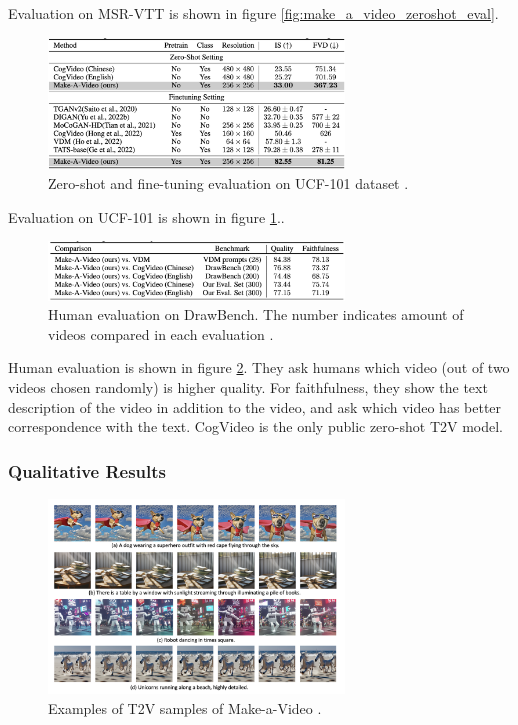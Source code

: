 Evaluation on MSR-VTT is shown in figure \ref{fig:make_a_video_zeroshot_eval}.

\begin{figure}[h]
    \centering
    \includegraphics[width=0.7\textwidth]{images/make_a_video/ucf_101.png}
    \caption{Zero-shot and fine-tuning evaluation on UCF-101 dataset \cite{make_a_video}.}
    \label{fig:make_a_video_ucf_101}
\end{figure}

Evaluation on UCF-101 is shown in figure \ref{fig:make_a_video_ucf_101}..

\begin{figure}[h]
    \centering
    \includegraphics[width=0.7\textwidth]{images/make_a_video/eval.png}
    \caption{Human evaluation on DrawBench. The number indicates amount of videos compared in each evaluation \cite{make_a_video}.}
    \label{fig:make_a_video_human_eval}
\end{figure}

Human evaluation is shown in figure \ref{fig:make_a_video_human_eval}. They ask humans which video (out of two videos chosen randomly) is higher quality. For faithfulness, they show the text description of the video in addition to the video, and ask which video has better correspondence with the text. CogVideo is the only public zero-shot T2V model.



\subsubsection{Qualitative Results}

\begin{figure}
    \centering
    \includegraphics[width=0.7\textwidth]{images/make_a_video/examples.png}
    \caption{Examples of T2V samples of Make-a-Video \cite{make_a_video}.}
    \label{fig:make_a_video_examples}
\end{figure}

